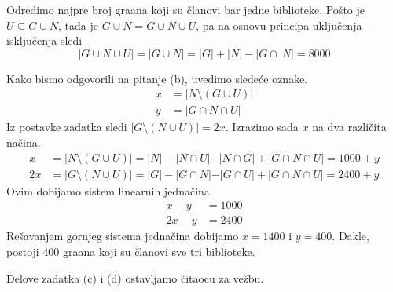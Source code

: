 {{Odredimo najpre broj gra\dj ana koji su \v clanovi bar jedne biblioteke. Po\v sto je $U\subseteq G\cup N$, tada je $G\cup N=G\cup N\cup U$, pa na osnovu principa uklju\v cenja-isklju\v cenja sledi
\[ \lvert G\cup N\cup U\rvert=\lvert G\cup N\rvert=\lvert G\rvert+\lvert N\rvert -\lvert G\cap\ N\rvert=8000 \]

Kako bismo odgovorili na pitanje (b), uvedimo slede\' ce oznake.
\begin{align*}
x&=\lvert N\setminus (G\cup U)\rvert\\
y&=\lvert G\cap N\cap U\rvert
\end{align*}
Iz postavke zadatka sledi $\lvert G\setminus(N\cup U)\rvert=2x$. Izrazimo sada $x$ na dva razli\v cita na\v cina.
\begin{align*}
x&=\lvert N\setminus (G\cup U)\rvert=\lvert N\rvert-\lvert N\cap U\rvert-\rvert N\cap G\rvert+\lvert G\cap N\cap U\rvert=1000+y\\
2x&=\lvert G\setminus(N\cup U)\rvert=\lvert G\rvert-\lvert G\cap N\rvert-\rvert G\cap U\rvert+\lvert G\cap N\cap U\rvert=2400+y
\end{align*}
Ovim dobijamo sistem linearnih jedna\v cina
\begin{align*}
x-y&=1000\\
2x-y&=2400
\end{align*}
Re\v savanjem gornjeg sistema jedna\v cina dobijamo $x=1400$ i $y=400$. Dakle, postoji 400 gra\dj ana koji su \v clanovi sve tri biblioteke.

Delove zadatka (c) i (d) ostavljamo \v citaocu za ve\v zbu.
}


}
